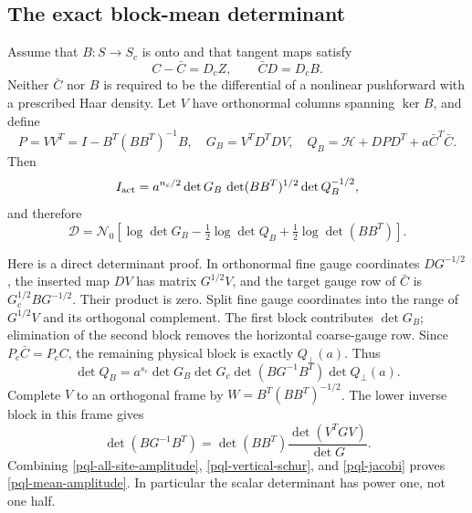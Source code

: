\subsection{The exact block-mean determinant}
\label{pql-mean-identity-section}

Assume that $B:S\to S_c$ is onto and that tangent maps satisfy
\begin{equation}
 C-\bar C=D_cZ,\qquad \bar CD=D_cB.
 \label{pql-tangent-identities}
\end{equation}
Neither $\bar C$ nor $B$ is required to be the differential of a
nonlinear pushforward with a prescribed Haar density.
Let $V$ have orthonormal columns spanning $\ker B$, and define
\begin{equation}
 P=VV^T=I-B^T(BB^T)^{-1}B,\quad
 G_B=V^TD^TDV,\quad
 Q_B=\mathcal H+DPD^T+a\bar C^T\bar C.
 \label{pql-mean-operators}
\end{equation}
Then
\begin{equation}
 I_{\rm act}
   =a^{n_c/2}\det G_B\,\det(BB^T)^{1/2}\det Q_B^{-1/2},
 \label{pql-mean-amplitude}
\end{equation}
and therefore
\begin{equation}
 \mathcal D=\mathcal N_0\left[
   \log\det G_B-\tfrac12\log\det Q_B
                          +\tfrac12\log\det(BB^T)\right].
 \label{pql-general-log}
\end{equation}

Here is a direct determinant proof. In orthonormal fine gauge
coordinates $DG^{-1/2}$, the inserted map $DV$ has matrix $G^{1/2}V$,
and the target gauge row of $\bar C$ is $G_c^{1/2}BG^{-1/2}$.
Their product is zero. Split fine gauge coordinates into the range
of $G^{1/2}V$ and its orthogonal complement. The first block contributes
$\det G_B$; elimination of the second block removes the horizontal
coarse-gauge row. Since $P_c\bar C=P_cC$, the remaining physical block
is exactly $Q_\perp(a)$. Thus
\begin{equation}
 \det Q_B=a^{s_c}\det G_B\det G_c
                    \det(BG^{-1}B^T)\det Q_\perp(a).
 \label{pql-vertical-schur}
\end{equation}
Complete $V$ to an orthogonal frame by
$W=B^T(BB^T)^{-1/2}$. The lower inverse block in this frame gives
\begin{equation}
 \det(BG^{-1}B^T)
       =\det(BB^T)\frac{\det(V^TGV)}{\det G}.
 \label{pql-jacobi}
\end{equation}
Combining \eqref{pql-all-site-amplitude},
\eqref{pql-vertical-schur}, and \eqref{pql-jacobi} proves
\eqref{pql-mean-amplitude}. In particular the scalar determinant
has power one, not one half.

